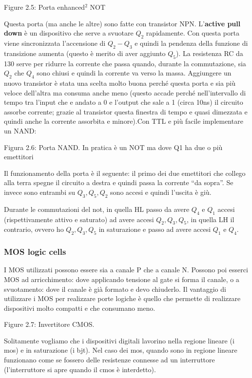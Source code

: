 \documentclass[
]{article}
\begin{document}
Figure 2.5: Porta enhanced\({}^{2}\) NOT

Questa porta (ma anche le altre) sono fatte con transistor NPN.
L'\textbf{active pull down} è un dispositivo che serve a svuotare
\(Q_{2}\) rapidamente. Con questa porta viene sincronizzata l'accensione
di \(Q_{2}-Q_{3}\) e quindi la pendenza della funzione di transizione
aumenta (questo è merito di aver aggiunto \(Q_{5}\)). La resistenza RC
da 130 serve per ridurre la corrente che passa quando, durante la
commutazione, sia \(Q_{2}\) che \(Q_{4}\) sono chiusi e quindi la
corrente va verso la massa. Aggiungere un nuovo transistor è stata una
scelta molto buona perché questa porta e sia più veloce dell'altra ma
consuma anche meno (questo accade perché nell'intervallo di tempo tra
l'input che e andato a 0 e l'output che sale a 1 (circa 10ns) il
circuito assorbe corrente; grazie al transistor questa finestra di tempo
e quasi dimezzata e quindi anche la corrente assorbita e
minore).\newline Con TTL e più facile implementare un NAND:

Figura 2.6: Porta NAND. In pratica è un NOT ma dove Q1 ha due o più
emettitori

Il funzionamento della porta è il seguente: il primo dei due emettitori
che collego alla terra spegne il circuito a destra e quindi passa la
corrente ``da sopra''. Se invece sono entrambi su \(Q_{3},Q_{5},Q_{2}\)
sono accesi e quindi l'uscita è giù.

Durante le commutazioni del not, in quella HL passo da avere \(Q_{4}\) e
\(Q_{1}\) accesi (rispettivamente attivo e saturato) ad avere accesi
\(Q_{2},Q_{3},Q_{5}\), in quella LH il contrario, ovvero ho
\(Q_{2},Q_{3},Q_{5}\) in saturazione e passo ad avere accesi \(Q_{1}\) e
\(Q_{4}\).

\subsubsection{MOS logic cells}\label{mos-logic-cells}

I MOS utilizzati possono essere sia a canale P che a canale N. Possono
poi esserci MOS ad arricchimento: dove applicando tensione al gate si
forma il canale, o a svuotamento: dove il canale è già formato e devo
chiuderlo. Il vantaggio di utilizzare i MOS per realizzare porte logiche
è quello che permette di realizzare dispositivi molto compatti e che
consumano meno.

Figure 2.7: Invertitore CMOS.

Solitamente vogliamo che i dispositivi digitali lavorino nella regione
lineare (i mos) e in saturazione (i bjt). Nel caso dei mos, quando sono
in regione lineare funzionano come se fossero delle resistenze connesse
ad un interruttore (l'interruttore si apre quando il cmos è interdetto).
\end{document}
